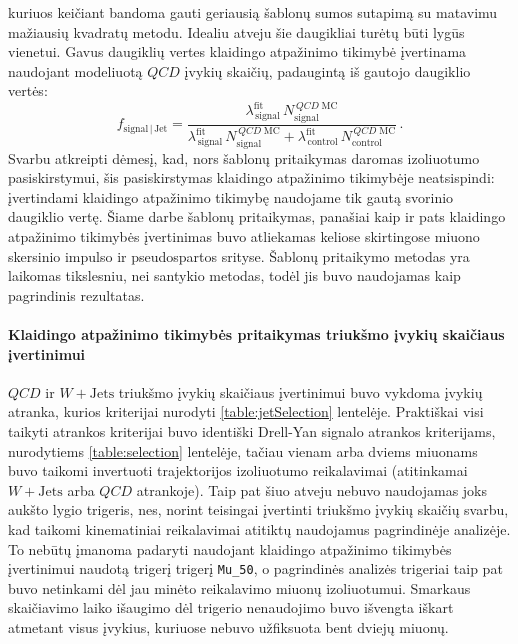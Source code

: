 \documentclass[a4paper, 12pt, oneside]{article}
\newcommand{\ttt}[1]{\texttt{#1}}
\newcommand{\WJets}{W\! +\!\mathrm{Jets}}
\newcommand{\QCD}{QC\! D}
\newlength\q
\begin{document}
\begin{enumerate}
	kuriuos keičiant bandoma gauti geriausią šablonų sumos sutapimą su matavimu mažiausių kvadratų metodu.
	Idealiu atveju šie daugikliai turėtų būti lygūs vienetui. 
	Gavus daugiklių vertes klaidingo atpažinimo tikimybė įvertinama naudojant modeliuotą $\QCD$ įvykių skaičių, padaugintą
	iš gautojo daugiklio vertės:
	\begin{equation}
		f_{\mathrm{signal} \,| \,\mathrm{Jet}} =
		\frac{\lambda^{\mathrm{fit}}_{\,\mathrm{signal}}\, N^{\,\QCD \; \mathrm{MC}}_{\mathrm{signal}}}
		{\lambda^{\mathrm{fit}}_{\,\mathrm{signal}}\, N^{\,\QCD \; \mathrm{MC}}_{\mathrm{signal}} +
		\lambda^{\mathrm{fit}}_{\,\mathrm{control}}\, N^{\,\QCD \; \mathrm{MC}}_{\mathrm{control}}}\, .
	\end{equation}
	Svarbu atkreipti dėmesį, kad, nors šablonų pritaikymas daromas izoliuotumo pasiskirstymui, šis pasiskirstymas klaidingo
	atpažinimo tikimybėje neatsispindi: įvertindami klaidingo atpažinimo tikimybę naudojame tik gautą svorinio daugiklio vertę.
	Šiame darbe šablonų pritaikymas, panašiai kaip ir pats klaidingo atpažinimo tikimybės įvertinimas buvo atliekamas keliose
	skirtingose miuono skersinio impulso ir pseudospartos srityse.
	Šablonų pritaikymo metodas yra laikomas tikslesniu, nei santykio metodas, todėl jis buvo naudojamas kaip pagrindinis rezultatas.
\end{enumerate}


\paragraph{Klaidingo atpažinimo tikimybės pritaikymas triukšmo įvykių skaičiaus įvertinimui\\}

$\QCD$ ir $\WJets$ triukšmo įvykių skaičiaus įvertinimui buvo vykdoma įvykių atranka, kurios kriterijai nurodyti
\ref{table:jetSelection} lentelėje.
Praktiškai visi taikyti atrankos kriterijai buvo identiški Drell-Yan signalo atrankos kriterijams, nurodytiems
\ref{table:selection} lentelėje, tačiau vienam arba dviems miuonams buvo taikomi invertuoti trajektorijos izoliuotumo
reikalavimai (atitinkamai $\WJets$ arba $\QCD$ atrankoje).
Taip pat šiuo atveju nebuvo naudojamas joks aukšto lygio trigeris, nes, norint teisingai įvertinti triukšmo įvykių skaičių
svarbu, kad taikomi kinematiniai reikalavimai atitiktų naudojamus pagrindinėje analizėje.
To nebūtų įmanoma padaryti naudojant klaidingo atpažinimo tikimybės įvertinimui naudotą trigerį trigerį \ttt{Mu\_50},
o pagrindinės analizės trigeriai taip pat buvo netinkami dėl jau minėto reikalavimo miuonų izoliuotumui.
Smarkaus skaičiavimo laiko išaugimo dėl trigerio nenaudojimo buvo išvengta iškart atmetant visus įvykius, kuriuose nebuvo
užfiksuota bent dviejų miuonų.
\end{document}
